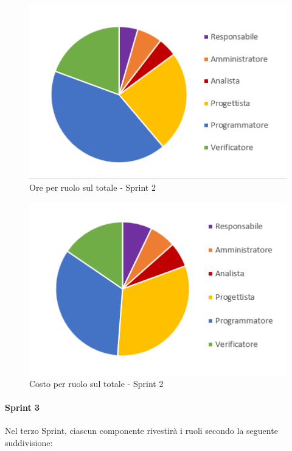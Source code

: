 \begin{figure}[H]
  \centering
  \includegraphics[scale=0.8]{immagini/2Sprint_oreRuolo.png}
  \caption{Ore per ruolo sul totale - Sprint 2}
\end{figure}

\begin{figure}[H]
  \centering
  \includegraphics[scale=0.8]{immagini/2Sprint_costoRuolo.png}
  \caption{Costo per ruolo sul totale - Sprint 2}
\end{figure}
\pagebreak

\paragraph{Sprint 3}
Nel terzo Sprint\glo{}, ciascun componente rivestirà i ruoli secondo la seguente suddivisione:

